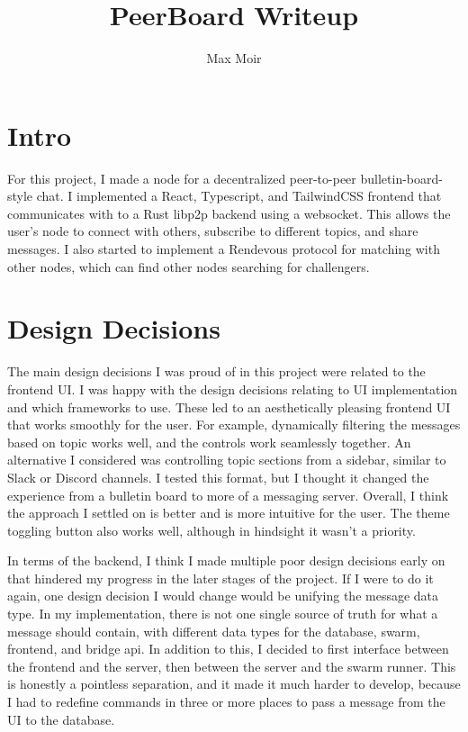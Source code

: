 \documentclass{article}
\title{PeerBoard Writeup}
\author{Max Moir}
\begin{document}
\maketitle


\section{Intro}
For this project, I made a node for a decentralized peer-to-peer bulletin-board-style chat. 
I implemented a React, Typescript, and TailwindCSS frontend that communicates with to a Rust libp2p backend using a websocket.
This allows the user's node to connect with others, subscribe to different topics, and share messages.
I also started to implement a Rendevous protocol for matching with other nodes, which can find other nodes searching for challengers.

\section{Design Decisions}

The main design decisions I was proud of in this project were related to the  
frontend UI. 
I was happy with the design decisions relating to UI implementation and which frameworks to use.
These led to an aesthetically pleasing frontend UI that works smoothly for the user.
For example, dynamically filtering the messages based on topic works well, and the controls 
work seamlessly together.
An alternative I considered was controlling topic sections from a sidebar, similar to Slack or Discord channels.
I tested this format, but I thought it changed the experience from a bulletin board to more of a messaging server.
Overall, I think the approach I settled on is better and is more intuitive for the user. 
The theme toggling button also works well, although in hindsight it wasn't a priority.

In terms of the backend, I think I made multiple poor design decisions early on that 
hindered my progress in the later stages of the project.
If I were to do it again, one design decision I would change would be unifying the
message data type. In my implementation, there is not one single source of truth for what a message
should contain, with different data types for the database, swarm, frontend, and bridge api. In addition
to this, I decided to first interface between the frontend and the server, then between the server and the
swarm runner. This is honestly a pointless separation, and it made it much harder to develop, because I had
to redefine commands in three or more places to pass a message from the UI to the database.
\end{document}
